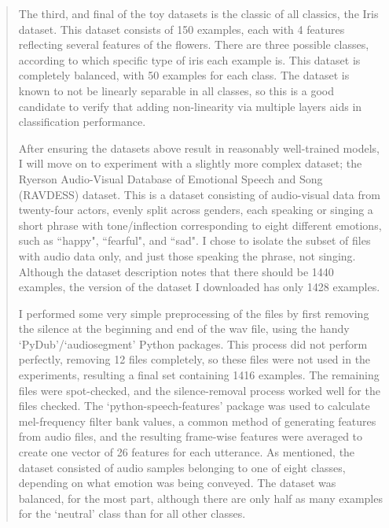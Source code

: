 \documentclass{article}
\begin{document}
\begin{quote}
The third, and final of the toy datasets is the classic of all classics, the Iris dataset. This dataset consists of 150 examples, each with 4 features reflecting several features of the flowers. There are three possible classes, according to which specific type of iris each example is. This dataset is completely balanced, with 50 examples for each class. The dataset is known to not be linearly separable in all classes, so this is a good candidate to verify that adding non-linearity via multiple layers aids in classification performance.

After ensuring the datasets above result in reasonably well-trained models, I will move on to experiment with a slightly more complex dataset; the Ryerson Audio-Visual Database of Emotional Speech and Song (RAVDESS) dataset. This is a dataset consisting of audio-visual data from twenty-four actors, evenly split across genders, each speaking or singing a short phrase with tone/inflection corresponding to eight different emotions, such as ``happy", ``fearful", and ``sad". I chose to isolate the subset of files with audio data only, and just those speaking the phrase, not singing. Although the dataset description notes that there should be 1440 examples, the version of the dataset I downloaded has only 1428 examples. 

I performed some very simple preprocessing of the files by first removing the silence at the beginning and end of the wav file, using the handy `PyDub'/`audiosegment' Python packages. This process did not perform perfectly, removing 12 files completely, so these files were not used in the experiments, resulting a final set containing 1416 examples. The remaining files were spot-checked, and the silence-removal process worked well for the files checked. The `python-speech-features' package was used to calculate mel-frequency filter bank values, a common method of generating features from audio files, and the resulting frame-wise features were averaged to create one vector of 26 features for each utterance. As mentioned, the dataset consisted of audio samples belonging to one of eight classes, depending on what emotion was being conveyed. The dataset was balanced, for the most part, although there are only half as many examples for the `neutral' class than for all other classes.
\end{quote}
\end{document}
